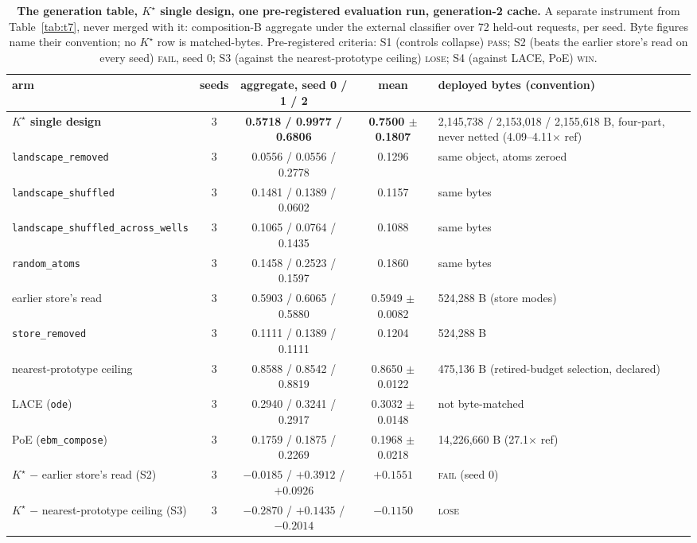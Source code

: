 \documentclass{article} %
\newcommand{\Kstar}{\ensuremath{K^{\star}}}
\begin{document}
\begin{table}[h]
\centering\scriptsize
\caption{\textbf{The generation table, $\Kstar$ single design, one pre-registered evaluation run, %
generation-2 cache.} A separate instrument from Table~\ref{tab:t7}, never merged with it:
composition-B aggregate under the external classifier over 72 held-out requests, per seed. %
Byte figures name their convention; no $\Kstar$ row is matched-bytes. Pre-registered criteria: S1
(controls collapse) \textsc{pass}; S2 (beats the earlier store's read on every seed) \textsc{fail}, seed 0;
S3 (against the nearest-prototype ceiling) \textsc{lose}; S4 (against LACE, PoE) \textsc{win}.}
\label{tab:gentable-kstar}
\setlength{\tabcolsep}{2.4pt}
\begin{adjustbox}{max width=\linewidth}\begin{tabular}{lcccp{4.2cm}}
\toprule
arm & seeds & aggregate, seed 0 / 1 / 2 & mean & deployed bytes (convention) \\
\midrule
\textbf{$\Kstar$ single design} & 3 & \textbf{0.5718 / 0.9977 / 0.6806} & \textbf{0.7500 $\pm$ 0.1807} & 2,145,738 / 2,153,018 / 2,155,618 B, four-part, never netted (4.09--4.11$\times$ ref) \\
\quad \texttt{landscape\_removed} & 3 & 0.0556 / 0.0556 / 0.2778 & 0.1296 & same object, atoms zeroed \\
\quad \texttt{landscape\_shuffled} & 3 & 0.1481 / 0.1389 / 0.0602 & 0.1157 & same bytes \\
\quad \texttt{landscape\_shuffled\_across\_wells} & 3 & 0.1065 / 0.0764 / 0.1435 & 0.1088 & same bytes \\
\quad \texttt{random\_atoms} & 3 & 0.1458 / 0.2523 / 0.1597 & 0.1860 & same bytes \\
earlier store's read & 3 & 0.5903 / 0.6065 / 0.5880 & 0.5949 $\pm$ 0.0082 & 524,288 B (store modes) \\
\texttt{store\_removed} & 3 & 0.1111 / 0.1389 / 0.1111 & 0.1204 & 524,288 B \\
nearest-prototype ceiling & 3 & 0.8588 / 0.8542 / 0.8819 & 0.8650 $\pm$ 0.0122 & 475,136 B (retired-budget selection, declared) \\
LACE (\texttt{ode}) & 3 & 0.2940 / 0.3241 / 0.2917 & 0.3032 $\pm$ 0.0148 & not byte-matched \\
PoE (\texttt{ebm\_compose}) & 3 & 0.1759 / 0.1875 / 0.2269 & 0.1968 $\pm$ 0.0218 & 14,226,660 B (27.1$\times$ ref) \\
\midrule
$\Kstar$ $-$ earlier store's read (S2) & 3 & $-0.0185$ / $+0.3912$ / $+0.0926$ & $+0.1551$ & \textsc{fail} (seed 0) \\
$\Kstar$ $-$ nearest-prototype ceiling (S3) & 3 & $-0.2870$ / $+0.1435$ / $-0.2014$ & $-0.1150$ & \textsc{lose} \\
\bottomrule
\end{tabular}\end{adjustbox}
\end{table}
\end{document}
